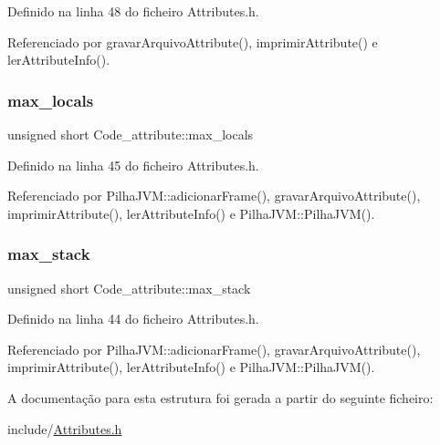 Definido na linha 48 do ficheiro Attributes.\+h.



Referenciado por gravar\+Arquivo\+Attribute(), imprimir\+Attribute() e ler\+Attribute\+Info().

\mbox{\label{structCode__attribute_a5c78e8e2f4557c3f95ef4ce844e4c34f}} 
\subsubsection{\texorpdfstring{max\+\_\+locals}{max\_locals}}
{\footnotesize\ttfamily unsigned short Code\+\_\+attribute\+::max\+\_\+locals}



Definido na linha 45 do ficheiro Attributes.\+h.



Referenciado por Pilha\+J\+V\+M\+::adicionar\+Frame(), gravar\+Arquivo\+Attribute(), imprimir\+Attribute(), ler\+Attribute\+Info() e Pilha\+J\+V\+M\+::\+Pilha\+J\+V\+M().

\mbox{\label{structCode__attribute_a79788dd1a87f20447908885db5eeb43e}} 
\subsubsection{\texorpdfstring{max\+\_\+stack}{max\_stack}}
{\footnotesize\ttfamily unsigned short Code\+\_\+attribute\+::max\+\_\+stack}



Definido na linha 44 do ficheiro Attributes.\+h.



Referenciado por Pilha\+J\+V\+M\+::adicionar\+Frame(), gravar\+Arquivo\+Attribute(), imprimir\+Attribute(), ler\+Attribute\+Info() e Pilha\+J\+V\+M\+::\+Pilha\+J\+V\+M().



A documentação para esta estrutura foi gerada a partir do seguinte ficheiro\+:\begin{DoxyCompactItemize}
\item 
include/\hyperlink{Attributes_8h}{Attributes.\+h}\end{DoxyCompactItemize}
